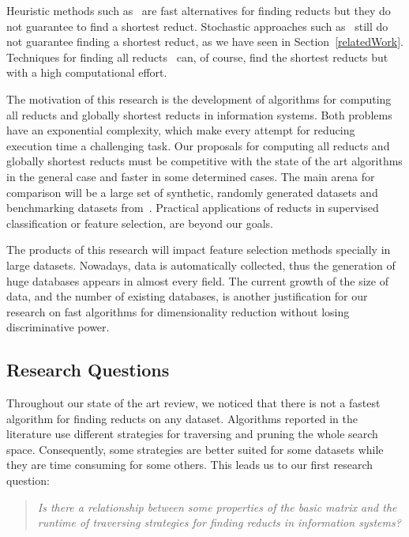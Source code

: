 \documentclass[authoryear,11pt]{elsarticle}
\begin{document}
  Heuristic methods such as~\citep{Chouchoulas01,Jensen04,Zhong01} are fast alternatives for finding 
  reducts but they do not guarantee to find a shortest reduct. Stochastic approaches such as~\citep{Wroblewski95,
  Jensen03,Chen10,Wang07} still do not guarantee finding a shortest reduct, as we have seen in 
  Section~\ref{relatedWork}. Techniques for finding all reducts~\citep{Starzyk99,WangP07} can, of course, find 
  the shortest reducts but with a high computational effort.
  
  The motivation of this research is the development of algorithms for computing all reducts and 
  globally shortest reducts in information systems. Both problems have an exponential complexity, which 
  make every attempt for reducing execution time a challenging task.
  Our proposals for computing all reducts and globally shortest reducts must be competitive with the state of 
  the art algorithms in the general case and faster in some determined cases. The main arena for comparison 
  will be a large set of synthetic, randomly generated datasets and benchmarking datasets from~\citep{Bache13}. 
  Practical applications of reducts in supervised classification or feature selection, are beyond our goals.
  
  The products of this research will impact feature selection methods specially in large datasets.
  Nowadays, data is automatically collected, thus the generation of huge databases appears in almost every 
  field. The current growth of the size of data, and the number of existing databases, is another justification 
  for our research on fast algorithms for dimensionality reduction without losing discriminative power.  
  
\subsection{Research Questions}\label{ResearchQuestions} 
  Throughout our state of the art review, we noticed that there is not a fastest algorithm for finding reducts 
  on any dataset. Algorithms reported in the literature use different strategies for traversing and pruning 
  the whole search space. Consequently, some strategies are better suited for some datasets while they are time
  consuming for some others. This leads us to our first research question:
  
\begin{quote}
  \emph{Is there a relationship between some properties of the basic matrix and the runtime 
  		of traversing strategies for finding reducts in information systems?}
\end{quote}
  		
\end{document}
